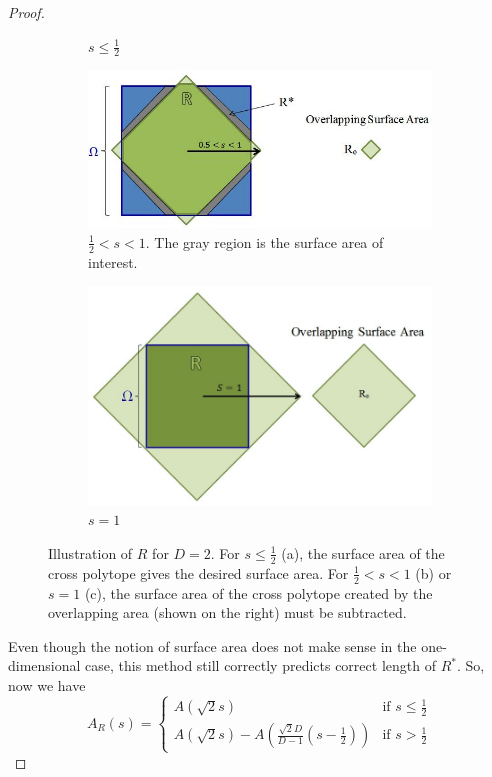 \documentclass[a4paper,10pt]{article}
\begin{document}
\begin{proof}
\begin{figure}
\begin{subfigure}[b]{1\textwidth}
        \caption{$s \leq \frac{1}{2}$}
        \label{fig:first}
    \end{subfigure}
    \begin{subfigure}[b]{1\textwidth}
        \centering
        \includegraphics[scale=.6]{images/overlappingExplanation_2.jpg}
        \caption{$\frac{1}{2} < s < 1$. The gray region is the surface area of interest.}
        \label{fig:second}
    \end{subfigure}
    \begin{subfigure}[b]{1\textwidth}
        \centering
        \includegraphics[scale=.5]{images/overlappingExplanation_3.jpg}
        \caption{$s = 1$}
        \label{fig:third}
    \end{subfigure}
    \caption{Illustration of $R$ for $D = 2$. For $s \leq \frac{1}{2}$ (a), the surface area of the cross polytope gives the desired surface area. For $\frac{1}{2} < s < 1$ (b) or $s = 1$ (c), the surface area of the cross polytope created by the overlapping area (shown on the right) must be subtracted.}
    \label{fig:examples}
\end{figure}

Even though the notion of surface area does not make sense in the one-dimensional case, this method still correctly predicts correct length of $R^*$. So, now we have
\begin{equation}
	A_{R}(s) = 
\begin{cases}
	A(\sqrt{2} s) & \mbox{if } s \leq \frac{1}{2} \\
   	A(\sqrt{2} s) - A\left(\frac{\sqrt{2}D}{D-1}\left(s-\frac{1}{2}\right)\right) & \mbox{if } s > \frac{1}{2}
\end{cases}
\end{equation}



\end{proof}
\end{document}
